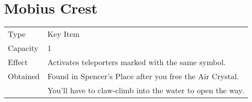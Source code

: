 \section{Mobius Crest}
\label{item:mobius_crest}


\noindent\begin{tabularx}{\textwidth}[l]{lX}
	Type
	& Key Item
\\ %
	Capacity
	& 1
\\ %
	Effect
	& Activates teleporters marked with the same symbol.
\\ %
	Obtained
	& Found in Spencer’s Place after you free the Air Crystal. \\
	& You’ll have to claw-climb into the water to open the way.
\end{tabularx}
